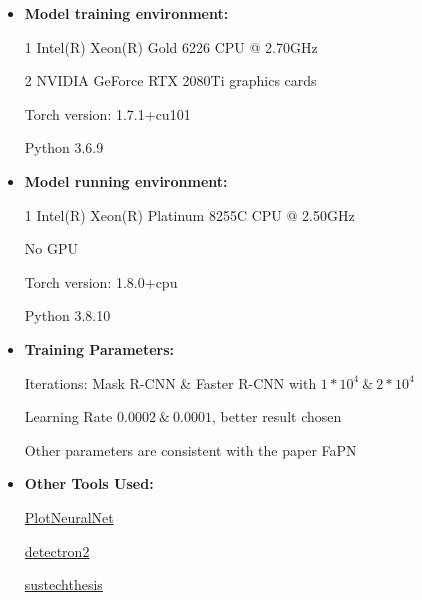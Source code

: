 \begin{itemize}
    \item \textbf{Model training environment: }
    
    1 Intel(R) Xeon(R) Gold 6226 CPU @ 2.70GHz

    2 NVIDIA GeForce RTX 2080Ti graphics cards

    Torch version: 1.7.1+cu101

    Python 3.6.9
    \item \textbf{Model running environment: }

    1 Intel(R) Xeon(R) Platinum 8255C CPU @ 2.50GHz

    No GPU

    Torch version: 1.8.0+cpu

    Python 3.8.10
    \item \textbf{Training Parameters: }

    Iterations: Mask R-CNN \& Faster R-CNN with $1 * 10^4\  \&\  2 * 10^4$

    Learning Rate $0.0002\  \&\  0.0001$, better result chosen

    Other parameters are consistent with the paper FaPN

    \item \textbf{Other Tools Used: }
    
    \href{https://github.com/HarisIqbal88/PlotNeuralNet}{PlotNeuralNet} \cite{plotNeuralNet}

    \href{https://github.com/facebookresearch/detectron2}{detectron2} \cite{wu2019detectron2}

    \href{https://github.com/iydon/sustechthesis}{sustechthesis} \cite{sustechthesis}


\end{itemize}




\clearpage